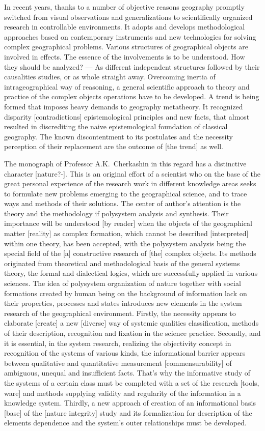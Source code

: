 \documentclass[12pt,leqno]{book}
\numberwithin{equation}{chapter}
\begin{document}
In recent years, thanks to a number of objective reasons geography promptly switched from visual observations and generalizations to scientifically organized research in controllable environments. It adopts and develops methodological approaches based on contemporary instruments and new technologies for solving complex geographical problems. Various structures of geographical objects are involved in effects. The essence of the involvements is to be understood. How they should be analyzed? --- As different independent structures followed by their causalities studies, or as whole straight away. Overcoming inertia of intrageographical way of reasoning, a general scientific approach to theory and practice of the complex objects operations have to be developed. A trend is being formed that imposes heavy demands to geography metatheory. It recognized disparity [contradictions] epistemological principles and new facts, that almost resulted in discrediting the naive epistemological foundation of classical geography. The known discontentment to its postulates and the necessity perception of their replacement are the outcome of [the trend] as well.

The monograph of Professor A.K.~Cherkashin in this regard has a distinctive character [nature?-]. This is an original effort of a scientist who on the base of the great personal experience of the research work in different knowledge areas seeks to formulate new problems emerging to the geographical science, and to trace ways and methods of their solutions. The center of author's attention is the theory and the methodology if polysystem analysis and synthesis. Their importance will be understood [by reader] when the objects of the geographical matter [reality] as complex formation, which cannot be described [interpreted] within one theory, has been accepted, with the polysystem analysis being the special field of the [a] constructive research of [the] complex objects. Its methods originated from theoretical and methodological basis of the general systems theory, the formal and dialectical logics, which are successfully applied in various sciences. The idea of polysystem organization of nature together with social formations created by human being on the background of information lack on their properties, processes and states introduces new elements in the system research of the geographical environment. Firstly, the necessity appears to elaborate [create] a new [diverse] way of systemic qualities classification, methods of their description, recognition and fixation in the science practice. Secondly, and it is essential, in the system research, realizing the objectivity concept in recognition of the systems of various kinds, the informational barrier appears between qualitative and quantitative measurement [commensurability] of ambiguous, unequal and insufficient facts. That's why the informative study of the systems of a certain class must be completed with a set of the research [tools, ware] and methods supplying validity and regularity of the information in a knowledge system. Thirdly, a new approach of creation of an informational basis [base] of the [nature integrity] study and its formalization for description of the elements dependence and the system's outer relationships must be developed.
\end{document}
